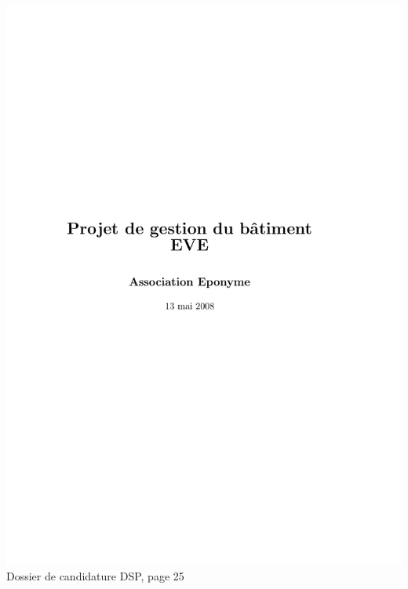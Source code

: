 \includegraphics[scale=0.85,trim=20mm 20mm 20mm 20mm,clip,page=25]{annexes/candidature_dsp.pdf} \\
Dossier de candidature DSP, page 25
\newpage
